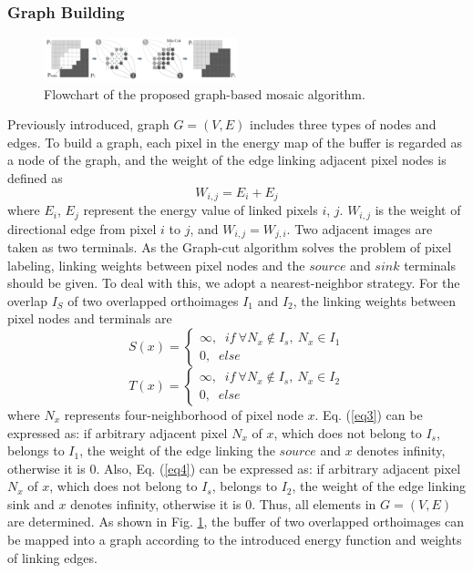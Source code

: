 \documentclass[journal]{IEEEtran}
\begin{document}
\subsubsection{Graph Building}
\begin{figure}[!t]
	\centering
	\includegraphics[width=0.5\textwidth]{link}
	\caption{Flowchart of the proposed graph-based mosaic algorithm.}
	\label{fig:link}
\end{figure}
Previously introduced, graph $G=\left(V, E \right)$ includes three types of nodes and edges. To build a graph, each pixel in the energy map of the buffer is regarded as a node of the graph, and the weight of the edge linking adjacent pixel nodes is defined as
\begin{equation}\label{eq2}
W_{i,j}=E_{i}+E_{j}
\end{equation}
where $E_i$, $E_j$ represent the energy value of linked pixels $i$, $j$. $W_{i,j}$ is the weight of directional edge from pixel $i$ to $j$, and $W_{i,j}=W_{j,i}$. Two adjacent images are taken as two terminals. As the Graph-cut algorithm solves the problem of pixel labeling, linking weights between pixel nodes and the $source$ and $sink$ terminals should be given. To deal with this, we adopt a nearest-neighbor strategy. For the overlap $I_S$ of two overlapped orthoimages $I_1$ and $I_2$, the linking weights between pixel nodes and terminals are
\begin{equation}\label{eq3}
S(x)= \left\{ {\begin{array}{*{20}{c}}
	{\infty,\;\;if~\forall N_{x}\notin I_{s},~N_{x}\in I_{1}}\\
	{0 ,\;\;else}
	\end{array}} \right.
\end{equation}
\begin{equation}\label{eq4}
T(x)= \left\{ {\begin{array}{*{20}{c}} 
	{\infty,\;\;if~\forall N_{x}\notin I_{s},~N_{x}\in I_{2}}\\
	{0 ,\;\;else}
	\end{array}} \right.
\end{equation}
where $N_x$ represents four-neighborhood of pixel node $x$. Eq. (\ref{eq3}) can be expressed as: if arbitrary adjacent pixel $N_x$ of $x$, which does not belong to $I_s$, belongs to $I_1$, the weight of the edge linking the $source$ and $x$ denotes infinity, otherwise it is 0. Also, Eq. (\ref{eq4}) can be expressed as: if arbitrary adjacent pixel $N_x$ of $x$, which does not belong to $I_s$, belongs to $I_2$, the weight of the edge linking sink and $x$ denotes infinity, otherwise it is 0. Thus, all elements in $G= (V, E)$ are determined. As shown in Fig. \ref{fig:link}, the buffer of two overlapped orthoimages can be mapped into a graph according to the introduced energy function and weights of linking edges.
\end{document}
